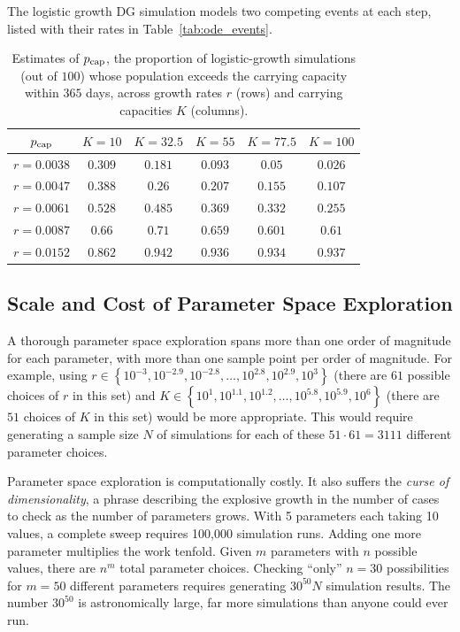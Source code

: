 \begin{example}
The logistic growth DG simulation models two competing events at each step, listed with their rates in Table~\ref{tab:ode_events}.


\begin{table}[htbp]
\centering
\begin{tabular}{||c | c | c | c | c | c ||}
 \hline
 $p_{\textup{cap}}$ & $K = 10$ & $K = 32.5$ & $ K = 55$ & $ K = 77.5$ & $K = 100$ \\ [0.5ex]
 \hline\hline
 $r = 0.0038$ & $0.309$ & $0.181$ & $0.093$ & $0.05$ & $0.026$ \\
 \hline
 $r = 0.0047$ & $0.388$ & $0.26$ & $0.207$ & $0.155$ & $0.107$  \\
 \hline
 $r = 0.0061$ & $0.528$  & $0.485$ & $0.369$ & $0.332$ & $0.255$ \\
 \hline
 $r = 0.0087$ & $0.66$  & $0.71$ & $0.659$ & $0.601$ & $0.61$ \\
 \hline
 $r = 0.0152$ & $0.862$  & $0.942$ & $0.936$ & $0.934$ & $0.937$ \\
 \hline
\end{tabular}
\caption{Estimates of $p_{\textup{cap}}$, the proportion of logistic-growth simulations (out of $100$) whose population exceeds the carrying capacity within $365$ days, across growth rates $r$ (rows) and carrying capacities $K$ (columns).}
\label{table:pcap}
\end{table}


\end{example}


\subsection{Scale and Cost of Parameter Space Exploration}\label{subsec:scale_cost_parameter_sweep}


A thorough parameter space exploration spans more than one order of magnitude for each parameter, with more than one sample point per order of magnitude. For example, using $r \in \left\{10^{-3}, 10^{-2.9}, 10^{-2.8}, \ldots, 10^{2.8}, 10^{2.9}, 10^3\right\}$ (there are $61$ possible choices of $r$ in this set) and $K \in \left\{10^1, 10^{1.1}, 10^{1.2}, \ldots, 10^{5.8}, 10^{5.9}, 10^6\right\}$ (there are $51$ choices of $K$ in this set) would be more appropriate. This would require generating a sample size $N$ of simulations for each of these $51\cdot 61 = 3111$ different parameter choices.

Parameter space exploration is computationally costly. It also suffers the \textit{curse of dimensionality}, a phrase describing the explosive growth in the number of cases to check as the number of parameters grows. With 5 parameters each taking 10 values, a complete sweep requires 100,000 simulation runs. Adding one more parameter multiplies the work tenfold. Given $m$ parameters with $n$ possible values, there are $n^m$ total parameter choices. Checking ``only'' $n=30$ possibilities for $m=50$ different parameters requires generating $30^{50} N$ simulation results. The number $30^{50}$ is astronomically large, far more simulations than anyone could ever run.

